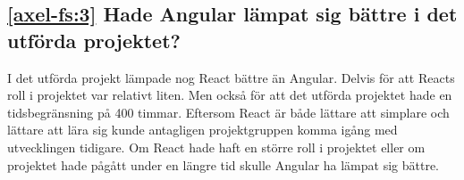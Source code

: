 \subsection*{\ref{axel-fs:3} Hade Angular lämpat sig bättre i det utförda projektet?}
I det utförda projekt lämpade nog React bättre än Angular. Delvis för att Reacts roll i projektet var relativt liten. Men också för att det utförda projektet hade en tidsbegränsning på 400 timmar. Eftersom React är både lättare att simplare och lättare att lära sig kunde antagligen projektgruppen komma igång med utvecklingen tidigare. Om React hade haft en större roll i projektet eller om projektet hade pågått under en längre tid skulle Angular ha lämpat sig bättre.


